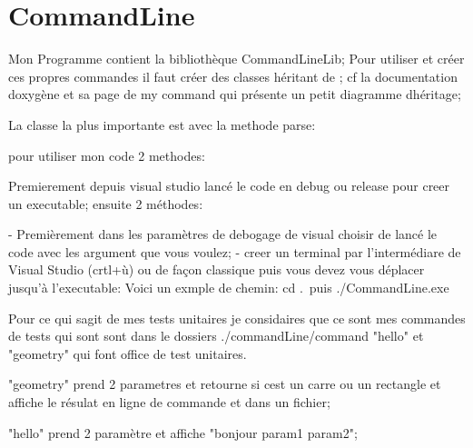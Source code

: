 \chapter{Command\+Line}
\hypertarget{md__r_e_a_d_m_e}{}\label{md__r_e_a_d_m_e}
\label{md__r_e_a_d_m_e_autotoc_md0}%
%
 Mon Programme contient la bibliothèque Command\+Line\+Lib; Pour utiliser et créer ces propres commandes il faut créer des classes héritant de ; cf la documentation doxygène et sa page de my command qui présente un petit diagramme d\textquotesingle{}héritage;

La classe la plus importante est  avec la methode parse\+:

pour utiliser mon code 2 methodes\+: \begin{DoxyVerb}Premierement depuis visual studio lancé le code en debug ou release pour creer un executable;
ensuite 2 méthodes:

    - Premièrement dans les paramètres de debogage de visual choisir de lancé
      le code avec les argument que vous voulez;
    - creer un terminal par l'intermédiare de Visual Studio (crtl+ù)
      ou de façon classique puis vous devez vous déplacer jusqu'à l'executable:
      Voici un exmple de chemin: cd .\CommandLine{}\Debug\ puis ./CommandLine.exe
\end{DoxyVerb}


Pour ce qui s\textquotesingle{}agit de mes tests unitaires je considaires que ce sont mes commandes de tests qui sont sont dans le dossiers ./command\+Line/command "{}hello"{} et "{}geometry"{} qui font office de test unitaires.

"{}geometry"{} prend 2 parametres et retourne si c\textquotesingle{}est un carre ou un rectangle et affiche le résulat en ligne de commande et dans un fichier;

"{}hello"{} prend 2 paramètre et affiche "{}bonjour param1 param2"{}; 